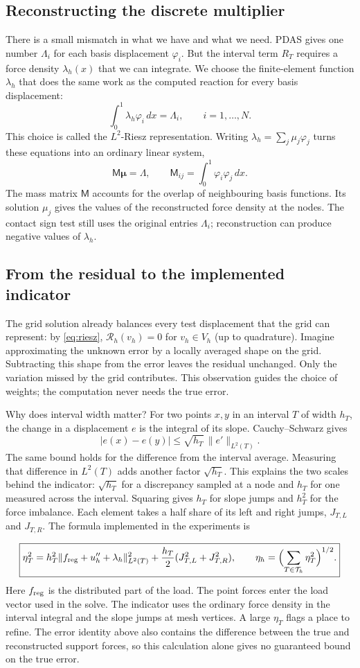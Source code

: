 \documentclass[11pt,a4paper]{article}
\newcommand{\Th}{\mathcal T_h}
\newcommand{\subsect}[1]{\Needspace{5\baselineskip}\subsection{#1}}
\begin{document}
\subsect{Reconstructing the discrete multiplier}\label{sec:multiplier}
There is a small mismatch in what we have and what we need. PDAS gives one number $\Lambda_i$ for each basis displacement $\varphi_i$. But the interval term $R_T$ requires a force density $\lambda_h(x)$ that we can integrate. We choose the finite-element function $\lambda_h$ that does the same work as the computed reaction for every basis displacement:
\[
 \int_0^1\lambda_h\varphi_i\,dx=\Lambda_i,\qquad i=1,\ldots,N.
\]
This choice is called the $L^2$-Riesz representation. Writing $\lambda_h=\sum_j\mu_j\varphi_j$ turns these equations into an ordinary linear system,
\begin{equation}\label{eq:riesz}
 \boxed{\mathsf M\boldsymbol\mu=\Lambda,\qquad \mathsf M_{ij}=\int_0^1\varphi_i\varphi_j\,dx.}
\end{equation}
The mass matrix $\mathsf M$ accounts for the overlap of neighbouring basis functions. Its solution $\mu_j$ gives the values of the reconstructed force density at the nodes. The contact sign test still uses the original entries $\Lambda_i$; reconstruction can produce negative values of $\lambda_h$.

\subsect{From the residual to the implemented indicator}
The grid solution already balances every test displacement that the grid can represent: by \eqref{eq:riesz}, $\mathcal R_h(v_h)=0$ for $v_h\in V_h$ (up to quadrature). Imagine approximating the unknown error by a locally averaged shape on the grid. Subtracting this shape from the error leaves the residual unchanged. Only the variation missed by the grid contributes. This observation guides the choice of weights; the computation never needs the true error.

Why does interval width matter? For two points $x,y$ in an interval $T$ of width $h_T$, the change in a displacement $e$ is the integral of its slope. Cauchy--Schwarz gives
\[
 |e(x)-e(y)|\leq \sqrt{h_T}\,\|e'\|_{L^2(T)}.
\]
The same bound holds for the difference from the interval average. Measuring that difference in $L^2(T)$ adds another factor $\sqrt{h_T}$. This explains the two scales behind the indicator: $\sqrt{h_T}$ for a discrepancy sampled at a node and $h_T$ for one measured across the interval. Squaring gives $h_T$ for slope jumps and $h_T^2$ for the force imbalance. Each element takes a half share of its left and right jumps, $J_{T,L}$ and $J_{T,R}$. The formula implemented in the experiments is

\begin{equation}\label{eq:indicator}
 \boxed{\eta_T^2=h_T^2\|f_{\rm reg}+u_h''+\lambda_h\|_{L^2(T)}^2
 +\frac{h_T}{2}(J_{T,L}^2+J_{T,R}^2),\qquad
 \eta_h=\Bigl(\sum_{T\in\Th}\eta_T^2\Bigr)^{1/2}.}
\end{equation}
Here $f_{\rm reg}$ is the distributed part of the load. The point forces enter the load vector used in the solve. The indicator uses the ordinary force density in the interval integral and the slope jumps at mesh vertices. A large $\eta_T$ flags a place to refine. The error identity above also contains the difference between the true and reconstructed support forces, so this calculation alone gives no guaranteed bound on the true error.
\end{document}
